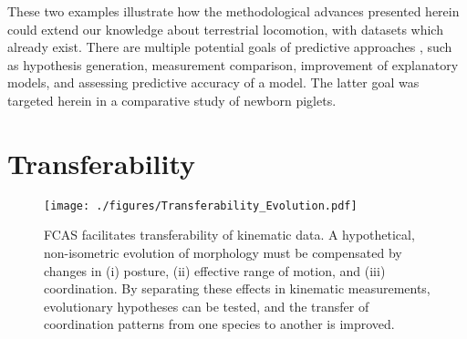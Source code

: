 \bigskip
These two examples illustrate how the methodological advances presented herein could extend our knowledge about terrestrial locomotion, with datasets which already exist.
There are multiple potential goals of predictive approaches \citep{Shmueli2010}, such as hypothesis generation, measurement comparison, improvement of explanatory models, and assessing predictive accuracy of a model.
The latter goal was targeted herein in a comparative study of newborn piglets.


\section{Transferability}
\label{sec:orgc914ebc}

\begin{change}
\begin{figure}[p]
\centering
\texttt{[image: ./figures/Transferability\_Evolution.pdf]}
\caption{\label{fig:transferability}FCAS facilitates transferability of kinematic data. A hypothetical, non-isometric evolution of morphology must be compensated by changes in (i) posture, (ii) effective range of motion, and (iii) coordination. By separating these effects in kinematic measurements, evolutionary hypotheses can be tested, and the transfer of coordination patterns from one species to another is improved.}
\end{figure}
\end{change}



